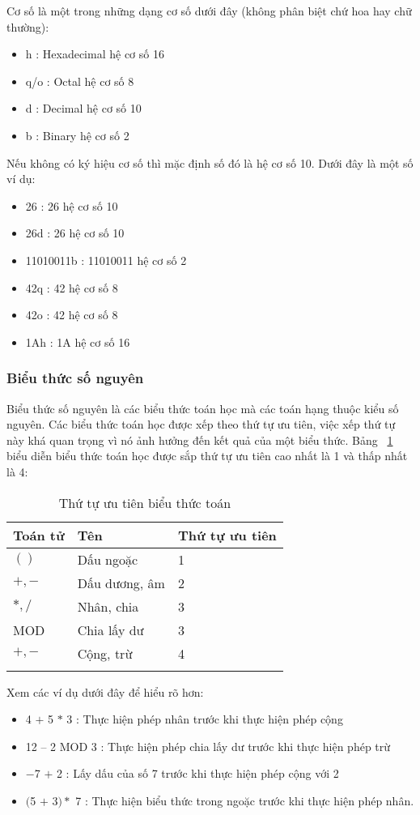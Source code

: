	Cơ số là một trong những dạng cơ số dưới đây (không phân biệt chứ hoa hay chữ thường):
		\begin{itemize}
		\renewcommand{\labelitemi}{\textbullet}	
			\item	h	: Hexadecimal hệ cơ số 16
			\item	q/o	: Octal hệ cơ số 8
			\item	d	: Decimal hệ cơ số 10
			\item	b	: Binary hệ cơ số 2
		\end{itemize}			
	Nếu không có ký hiệu cơ số thì mặc định số đó là hệ cơ số 10. Dưới đây là một số ví dụ:
	\begin{itemize}
	\item	26		: 26 hệ cơ số 10
	\item	26d		: 26 hệ cơ số 10
	\item	11010011b	: 11010011 hệ cơ số 2
	\item	42q		: 42 hệ cơ số 8
	\item	42o		: 42 hệ cơ số 8
	\item	1Ah		: 1A hệ cơ số 16
	\end{itemize}	
	
	\subsubsection*{Biểu thức số nguyên}
	Biểu thức số nguyên là các biểu thức toán học mà các toán hạng thuộc kiểu số nguyên. Các biểu thức toán học được xếp theo thứ tự ưu tiên, việc xếp thứ tự này khá quan trọng vì nó ảnh hưởng đến kết quả của một biểu thức. Bảng ~\ref{tb:BTToan} biểu diễn biểu thức toán học được sắp thứ tự ưu tiên cao nhất là 1 và thấp nhất là 4:	\\
	
	\newpage
	\begin{longtable}{ | m{3cm} | m{5cm} |m{5cm} |}
			\hline
				Toán tử &	Tên &	Thứ tự ưu tiên\\
			\hline
			\hline
			$()$	 &	Dấu ngoặc&		1\\
			\hline
			$+, -$ &		Dấu dương, âm&		2\\
			\hline
			$*, /$	&	Nhân, chia&		3\\
			\hline
			MOD	&	Chia lấy dư&		3\\
			\hline
			$+,-$	&	Cộng, trừ	&	4\\
			\hline
			\caption{Thứ tự ưu tiên biểu thức toán}
			\label{tb:BTToan}
	\end{longtable}
	Xem các ví dụ dưới đây để hiểu rõ hơn:
	\begin{itemize}
	\item  4 $+$ 5 $*$ 3 		: Thực hiện phép nhân trước khi thực hiện phép cộng
	\item	 12 – 2 MOD 3	: Thực hiện phép chia lấy dư trước khi thực hiện phép trừ
	\item	 $-$7 $+$ 2			: Lấy dấu của số 7 trước khi thực hiện phép cộng với 2
	\item	$($5 $+$ 3$) *$ 7		: Thực hiện biểu thức trong ngoặc trước khi thực hiện phép nhân. 
	\end{itemize}
	
